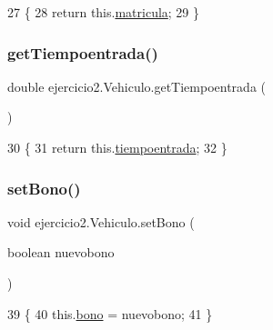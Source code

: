 \begin{DoxyCode}
27                                 \{
28         \textcolor{keywordflow}{return} this.\mbox{\hyperlink{classejercicio2_1_1_vehiculo_ad1079a268592164697f127dc2880c32b}{matricula}};
29     \}
\end{DoxyCode}
\mbox{\label{classejercicio2_1_1_vehiculo_a72ab12e069d44e40cd9a5a56c34932ed}} 
\subsubsection{\texorpdfstring{get\+Tiempoentrada()}{getTiempoentrada()}}
{\footnotesize\ttfamily double ejercicio2.\+Vehiculo.\+get\+Tiempoentrada (\begin{DoxyParamCaption}{ }\end{DoxyParamCaption})\hspace{0.3cm}{\ttfamily [inline]}}


\begin{DoxyCode}
30                                     \{
31         \textcolor{keywordflow}{return} this.\mbox{\hyperlink{classejercicio2_1_1_vehiculo_ae69e0b6da5d8596b7a4a16363a13242e}{tiempoentrada}};
32     \}
\end{DoxyCode}
\mbox{\label{classejercicio2_1_1_vehiculo_a10083fde68a5b3ef8698c76adba64ad7}} 
\subsubsection{\texorpdfstring{set\+Bono()}{setBono()}}
{\footnotesize\ttfamily void ejercicio2.\+Vehiculo.\+set\+Bono (\begin{DoxyParamCaption}\item[{boolean}]{nuevobono }\end{DoxyParamCaption})\hspace{0.3cm}{\ttfamily [inline]}}


\begin{DoxyCode}
39                                            \{
40         this.\mbox{\hyperlink{classejercicio2_1_1_vehiculo_a389cff48d0624a033052cc0bb27aff16}{bono}} = nuevobono;      
41     \}
\end{DoxyCode}
\mbox{\label{classejercicio2_1_1_vehiculo_af87ce3fcfad1f20eb2fdbb87caaf6576}} 
